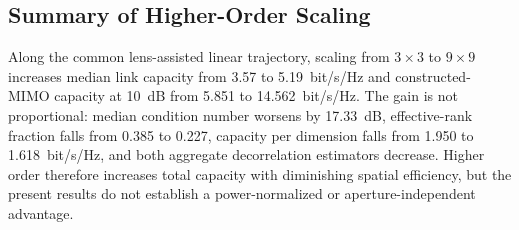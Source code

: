 \subsection{Summary of Higher-Order Scaling}

Along the common lens-assisted linear trajectory, scaling from $3\times3$ to $9\times9$ increases median link capacity from 3.57 to 5.19~bit/s/Hz and constructed-MIMO capacity at 10~dB from 5.851 to 14.562~bit/s/Hz. The gain is not proportional: median condition number worsens by 17.33~dB, effective-rank fraction falls from 0.385 to 0.227, capacity per dimension falls from 1.950 to 1.618~bit/s/Hz, and both aggregate decorrelation estimators decrease. Higher order therefore increases total capacity with diminishing spatial efficiency, but the present results do not establish a power-normalized or aperture-independent advantage.
